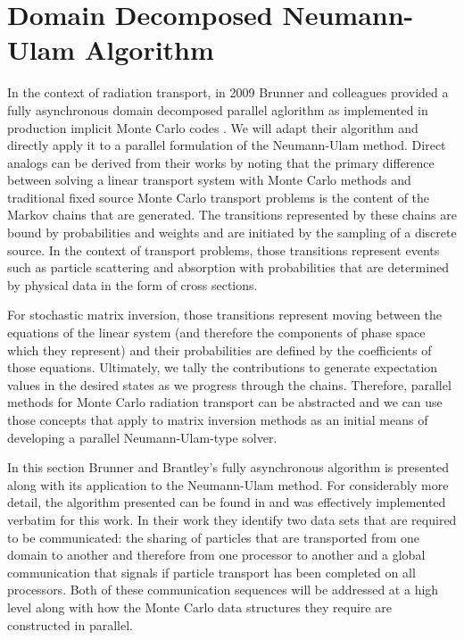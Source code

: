 \clearpage

\section{Domain Decomposed Neumann-Ulam Algorithm\ }
\label{sec:asynchronous_algorithm}
In the context of radiation transport, in 2009 Brunner and colleagues
provided a fully asynchronous domain decomposed parallel aglorithm as
implemented in production implicit Monte Carlo codes
\citep{brunner_efficient_2009}. We will adapt their algorithm and
directly apply it to a parallel formulation of the Neumann-Ulam
method. Direct analogs can be derived from their works by noting that
the primary difference between solving a linear transport system with
Monte Carlo methods and traditional fixed source Monte Carlo transport
problems is the content of the Markov chains that are generated. The
transitions represented by these chains are bound by probabilities and
weights and are initiated by the sampling of a discrete source. In the
context of transport problems, those transitions represent events such
as particle scattering and absorption with probabilities that are
determined by physical data in the form of cross sections.

For stochastic matrix inversion, those transitions represent moving
between the equations of the linear system (and therefore the
components of phase space which they represent) and their
probabilities are defined by the coefficients of those
equations. Ultimately, we tally the contributions to generate
expectation values in the desired states as we progress through the
chains. Therefore, parallel methods for Monte Carlo radiation
transport can be abstracted and we can use those concepts that apply
to matrix inversion methods as an initial means of developing a
parallel Neumann-Ulam-type solver. 

In this section Brunner and Brantley's fully asynchronous algorithm is
presented along with its application to the Neumann-Ulam method. For
considerably more detail, the algorithm presented can be found in
\citep{brunner_efficient_2009} and was effectively implemented
verbatim for this work. In their work they identify two data sets that
are required to be communicated: the sharing of particles that are
transported from one domain to another and therefore from one
processor to another and a global communication that signals if
particle transport has been completed on all processors. Both of these
communication sequences will be addressed at a high level along with
how the Monte Carlo data structures they require are constructed in
parallel.

